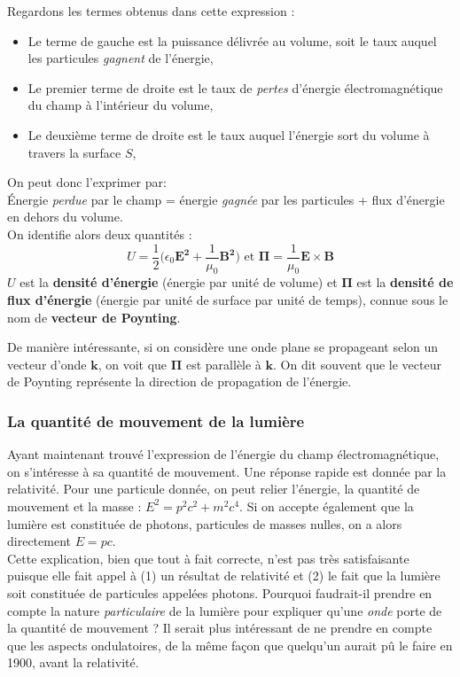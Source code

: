 Regardons les termes obtenus dans cette expression :
\begin{itemize}
\item Le terme de gauche est la puissance délivrée au volume, soit le taux auquel les particules \textit{gagnent} de l'énergie,
\item Le premier terme de droite est le taux de \textit{pertes} d'énergie électromagnétique du champ à l'intérieur du volume,
\item Le deuxième terme de droite est le taux auquel l'énergie sort du volume à travers la surface $S$,
\end{itemize}
On peut donc l'exprimer par:\\\'Energie \textit{perdue} par le champ = énergie \textit{gagnée} par les particules + flux d'énergie en dehors du volume. \\On identifie alors deux quantités :
\begin{equation}
U=\frac{1}{2}\biggl(\epsilon_0\bm{E^2}+\frac{1}{\mu_0}\bm{B^2}\biggr) \mbox{   et   } \bm{\Pi} = \frac{1}{\mu_0}\bm{E}\times\bm{B}
\label{Def.Poynting}
\end{equation}
$U$ est la \textbf{densité d'énergie} (énergie par unité de volume) et $\bm{\Pi}$ est la \textbf{densité de flux d'énergie} (énergie par unité de surface par unité de temps), connue sous le nom de \textbf{vecteur de Poynting}.

De manière intéressante, si on considère une onde plane se propageant selon un vecteur d'onde $\bm{k}$, on voit que $\bm{\Pi}$ est parallèle à $\bm{k}$. On dit souvent que le vecteur de Poynting représente la direction de propagation de l'énergie.

\subsubsection{La quantité de mouvement de la lumière}
Ayant maintenant trouvé l'expression de l'énergie du champ électromagnétique, on s'intéresse à sa quantité de mouvement. Une réponse rapide est donnée par la relativité. Pour une particule donnée, on peut relier l'énergie, la quantité de mouvement et la masse : $E^2=p^2c^2+m^2c^4$. Si on accepte également que la lumière est constituée de photons, particules de masses nulles, on a alors directement $E = pc$.\\
Cette explication, bien que tout à fait correcte, n'est pas très satisfaisante puisque elle fait appel à (1) un résultat de relativité et (2) le fait que la lumière soit constituée de particules appelées photons. Pourquoi faudrait-il prendre en compte la nature \textit{particulaire} de la lumière pour expliquer qu'une \textit{onde} porte de la quantité de mouvement ? Il serait plus intéressant de ne prendre en compte que les aspects ondulatoires, de la même façon que quelqu'un aurait pû le faire en 1900, avant la relativité.

